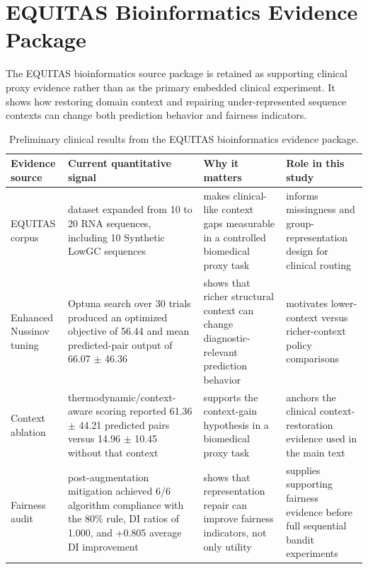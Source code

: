 \documentclass[conference]{IEEEtran}
\begin{document}
\begin{table}[!t]
\section{EQUITAS Bioinformatics Evidence Package}
\label{app:equitas_bioinformatics_evidence}
The EQUITAS bioinformatics source package is retained as supporting clinical
proxy evidence rather than as the primary embedded clinical experiment. It
shows how restoring domain context and repairing under-represented sequence
contexts can change both prediction behavior and fairness indicators.

\caption{Preliminary clinical results from the EQUITAS bioinformatics evidence package.}
\label{tab:clinical_prelim_results}
\centering
\setlength{\tabcolsep}{5pt}
\begin{tabular}{p{}p{}p{}p{}}
\toprule
\textbf{Evidence source} & \textbf{Current quantitative signal} & \textbf{Why it matters} & \textbf{Role in this study} \\
\midrule
EQUITAS corpus & dataset expanded from 10 to 20 RNA sequences, including 10 Synthetic LowGC sequences & makes clinical-like context gaps measurable in a controlled biomedical proxy task & informs missingness and group-representation design for clinical routing \\
Enhanced Nussinov tuning & Optuna search over 30 trials produced an optimized objective of 56.44 and mean predicted-pair output of 66.07 $\pm$ 46.36 & shows that richer structural context can change diagnostic-relevant prediction behavior & motivates lower-context versus richer-context policy comparisons \\
Context ablation & thermodynamic/context-aware scoring reported 61.36 $\pm$ 44.21 predicted pairs versus 14.96 $\pm$ 10.45 without that context & supports the context-gain hypothesis in a biomedical proxy task & anchors the clinical context-restoration evidence used in the main text \\
Fairness audit & post-augmentation mitigation achieved 6/6 algorithm compliance with the 80\% rule, DI ratios of 1.000, and +0.805 average DI improvement & shows that representation repair can improve fairness indicators, not only utility & supplies supporting fairness evidence before full sequential bandit experiments \\
\bottomrule
\end{tabular}
\end{table}
\end{document}
